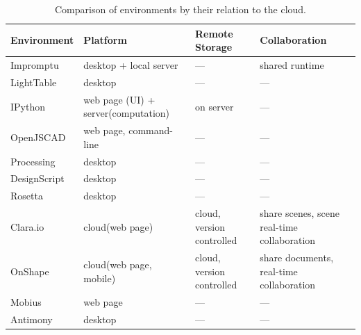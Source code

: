 \begin{table}
	\centering
	\renewcommand{\arraystretch}{1.2}

	\begin{tabulary}{\textwidth}{lLLL}
		\toprule
		{\bf Environment} & {\bf Platform} 											& {\bf Remote Storage}			& {\bf Collaboration} 												\\
		\midrule
		Impromptu			& desktop + local server							& ---												& shared runtime															\\
		LightTable		& desktop															& ---												& ---																					\\
		IPython				& web page (UI) + server(computation)	& on server									& ---																					\\
		OpenJSCAD			& web page, command-line							& ---												& ---																					\\
		Processing		& desktop															& ---												& ---																					\\
		DesignScript	& desktop															& ---												& ---																					\\
		Rosetta				& desktop															& ---												& ---																					\\
		Clara.io			& cloud(web page)											& cloud, version controlled	& share scenes, scene real-time collaboration	\\
		OnShape				& cloud(web page, mobile)							& cloud, version controlled	& share documents, real-time collaboration		\\
		Mobius				& web page														& ---												& ---																					\\
		Antimony			& desktop															& ---												& ---																					\\
		\bottomrule
	\end{tabulary}

	\caption{Comparison of environments by their relation to the cloud.}
	\label{table:cloud:comp}
\end{table}

